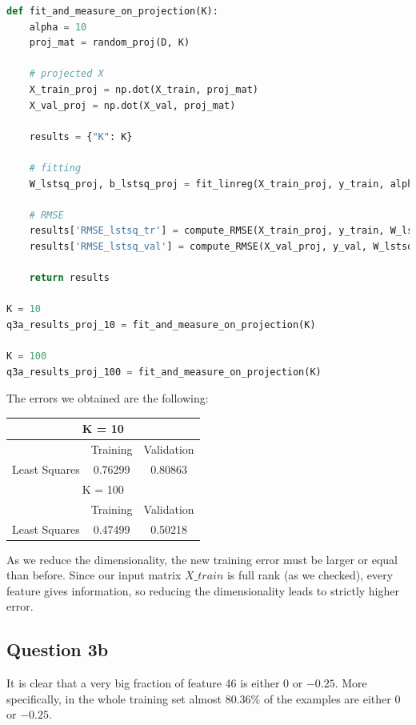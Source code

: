 \documentclass{article}
\begin{document}
\begin{lstlisting}[language=Python]
def fit_and_measure_on_projection(K):
    alpha = 10
    proj_mat = random_proj(D, K)

    # projected X
    X_train_proj = np.dot(X_train, proj_mat)
    X_val_proj = np.dot(X_val, proj_mat)

    results = {"K": K}

    # fitting
    W_lstsq_proj, b_lstsq_proj = fit_linreg(X_train_proj, y_train, alpha)

    # RMSE
    results['RMSE_lstsq_tr'] = compute_RMSE(X_train_proj, y_train, W_lstsq_proj, b_lstsq_proj)
    results['RMSE_lstsq_val'] = compute_RMSE(X_val_proj, y_val, W_lstsq_proj, b_lstsq_proj)
    
    return results

K = 10
q3a_results_proj_10 = fit_and_measure_on_projection(K)

K = 100
q3a_results_proj_100 = fit_and_measure_on_projection(K)
\end{lstlisting}


The errors we obtained are the following:
\begin{center}
\begin{tabular}{ | c | c | c | }
\hline
\multicolumn{3}{|c|}{ K = 10 } \\
\hline
 & Training & Validation \\
\hline
Least Squares & 0.76299 & 0.80863\\ 
\hline

\hline 
\hline

\multicolumn{3}{|c|}{ K = 100 } \\
\hline
 & Training & Validation \\
\hline
Least Squares & 0.47499 & 0.50218 \\ 
\hline
\end{tabular}
\end{center}


As we reduce the dimensionality, the new training error must be larger or equal than before. Since our input matrix $X\_train$ is full rank (as we checked), every feature gives information, so reducing the dimensionality leads to strictly higher error.


\subsection*{Question 3b}

It is clear that a very big fraction of feature 46 is either $0$ or $-0.25$. More specifically, in the whole training set almost $80.36\%$ of the examples are either $0$ or $-0.25$.
\end{document}

